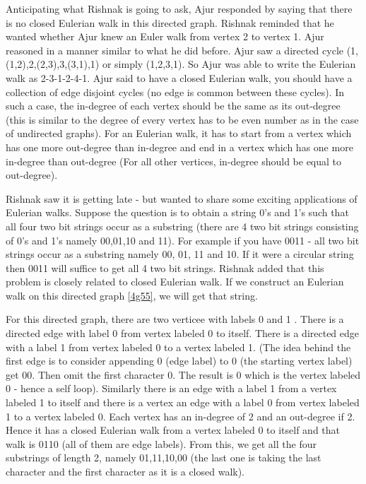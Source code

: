 Anticipating what Rishnak is going to ask, Ajur responded by saying that there is no closed Eulerian walk in this directed graph. Rishnak reminded that he wanted whether Ajur knew an Euler walk from vertex 2 to vertex 1. Ajur reasoned in a  manner similar to what he did before. Ajur saw a directed cycle (1,(1,2),2,(2,3),3,(3,1),1) or simply (1,2,3,1). So Ajur was able to write the Eulerian walk as 2-3-1-2-4-1. Ajur said to have a closed Eulerian walk, you should have a collection of edge disjoint cycles (no edge is common between these cycles). In such a case, the in-degree of each vertex should be the same as its out-degree (this is similar to the degree of every vertex has to be even number as in the case of undirected graphs). For an Eulerian walk, it has to start from a vertex which has one more out-degree than in-degree and end in a vertex which has one more in-degree than out-degree (For all other vertices, in-degree should be equal to out-degree).

Rishnak saw it is getting late - but wanted to share some exciting applications of Eulerian walks. 
Suppose the question is to obtain a string 0's and 1's such that all four two bit strings occur as a substring (there are 4 two bit strings consisting of 0's and 1's namely 00,01,10 and 11). For example if you have 0011 - all two bit strings occur as a substring namely 00, 01, 11 and 10. If it were a circular string then 0011 will suffice to get all 4 two bit strings. Rishnak added that this problem is closely related to closed Eulerian walk. If we construct an Eulerian walk on this directed graph \ref{4g55}, we will get that string.

For this directed graph, there are two verticee with labels 0 and 1 . There is a directed edge with label 0 from vertex labeled 0 to itself. There is a directed edge with a label 1 from vertex labeled 0 to a vertex labeled 1. (The idea behind the first edge is to consider appending 0 (edge label) to 0 (the starting vertex label) get 00. Then omit the first character 0. The result is 0 which is the vertex labeled 0 - hence a self loop). Similarly there is an edge with a label 1 from a vertex labeled 1 to itself and there is a vertex an edge with 
a label 0 from vertex labeled 1 to a vertex labeled 0.
Each vertex has an in-degree of 2 and an out-degree if 2. Hence it has a closed Eulerian walk from a vertex labeled 0 to itself and that walk is 0110 (all of them are edge labels). From this, we get all the four substrings of length 2, namely 01,11,10,00 (the last one is taking the last character and the first character as it is a closed walk).

